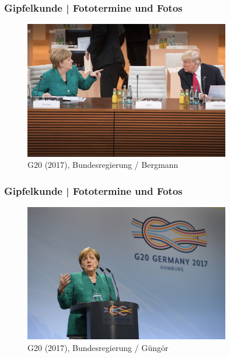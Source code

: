 \documentclass[]{beamer}
\begin{document}
	\begin{frame}
	\frametitle{Gipfelkunde | Fototermine und Fotos}
	\begin{figure}[h!]
		\renewcommand{\figurename}{Foto} 
		\includegraphics[width=0.8\textwidth]{images/fotos_07_BundesregierungBergmann}
		\caption{G20 (2017), Bundesregierung / Bergmann}
	\end{figure}
	\end{frame}

	\begin{frame}
	\frametitle{Gipfelkunde | Fototermine und Fotos}
	\begin{figure}[h!]
		\renewcommand{\figurename}{Foto} 
		\includegraphics[width=0.8\textwidth]{images/fotos_08_BundesregierungGuengoer}
		\caption{G20 (2017), Bundesregierung / Güngör}
	\end{figure}
	\end{frame}
\end{document}
